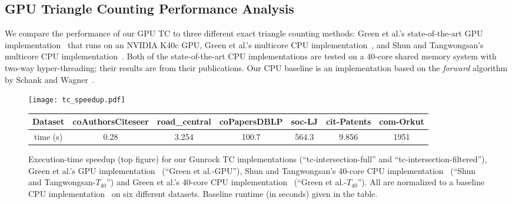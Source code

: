 \documentclass[format=acmsmall,review=false,screen=true]{acmart}
\begin{document}
\subsection{GPU Triangle Counting Performance Analysis}
We compare the performance of our GPU TC to three different exact
triangle counting methods: Green et al.'s state-of-the-art GPU
implementation~ that runs on an NVIDIA K40c
GPU\@, Green et al.'s multicore CPU
implementation~, and Shun and Tangwongsan's
multicore CPU implementation~. Both of the
state-of-the-art CPU implementations are tested on a 40-core shared
memory system with two-way hyper-threading; their results are from
their publications. Our CPU baseline is an implementation based on the
\emph{forward} algorithm by Schank and
Wagner~.

\begin{figure}
    \centering
    \begin{minipage}{\textwidth}
    \centering
    \texttt{[image: tc\_speedup.pdf]}
    \end{minipage}
    \centering
    \begin{adjustbox}{max width=\textwidth}
     \begin{tabular}{*{7}{c}}
      \toprule Dataset &coAuthorsCiteseer&road\_central & coPapersDBLP & soc-LJ & cit-Patents & com-Orkut\\
    \midrule
      time (s) &0.28& 3.254 & 100.7 &564.3 & 9.856 & 1951
    \\ \bottomrule
  \end{tabular}
  \end{adjustbox}
  \caption[Execution-time speedup for our Gunrock TC
  implementations.]{Execution-time speedup (top figure) for our
    Gunrock TC implementations (``tc-intersection-full'' and
    ``tc-intersection-filtered''), Green et al.'s GPU
    implementation~ (``Green et al.-GPU''),
    Shun and Tangwongsan's 40-core CPU
    implementation~ (``Shun and
    Tangwongsan-$T_{40}$'') and Green et al.'s 40-core CPU
    implementation~ (``Green et
    al.-$T_{40}$''). All are normalized to a baseline CPU
    implementation~ on six different
    datasets. Baseline runtime (in seconds) given in the
    table.\label{fig:tc_speedup}}
\end{figure}
\end{document}
